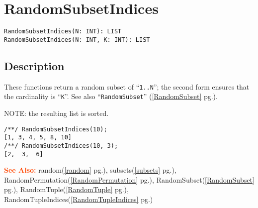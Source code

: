 \documentclass[a4paper]{mybook}
\newenvironment{command}{}{} %
\newcommand\SeeAlso{\par\textcolor{OrangeRed}{\textbf{\large See Also: }}}
\begin{document}
\section{RandomSubsetIndices}
\label{RandomSubsetIndices}
\begin{command} %


\begin{Verbatim}[label=syntax, rulecolor=\color{MidnightBlue},
frame=single]
RandomSubsetIndices(N: INT): LIST
RandomSubsetIndices(N: INT, K: INT): LIST
\end{Verbatim}


\subsection*{Description}

These functions return a random subset of ``\verb&1..N&''; the second form
ensures that the cardinality is ``\verb&K&''.  See also ``\verb&RandomSubset&'' (\ref{RandomSubset} pg.\pageref{RandomSubset}).
\par 
NOTE: the resulting list is sorted.
\begin{Verbatim}[label=example, rulecolor=\color{PineGreen}, frame=single]
/**/ RandomSubsetIndices(10);
[1, 3, 4, 5, 8, 10]
/**/ RandomSubsetIndices(10, 3);
[2,  3,  6]
\end{Verbatim}


\SeeAlso %
  random(\ref{random} pg.\pageref{random}), 
    subsets(\ref{subsets} pg.\pageref{subsets}), 
    RandomPermutation(\ref{RandomPermutation} pg.\pageref{RandomPermutation}), 
    RandomSubset(\ref{RandomSubset} pg.\pageref{RandomSubset}), 
    RandomTuple(\ref{RandomTuple} pg.\pageref{RandomTuple}), 
    RandomTupleIndices(\ref{RandomTupleIndices} pg.\pageref{RandomTupleIndices})
\end{command} %
\end{document}
